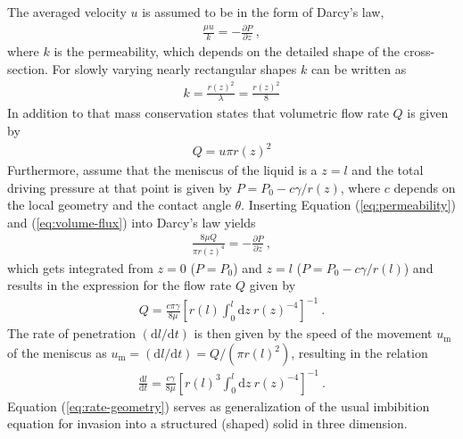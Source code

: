 \documentclass[aip, amsmath, amssymb, reprint, twocolumn, floatfix]{revtex4-1}
\newcommand{\dldt}{\frac{\mathrm{d}l}{\mathrm{d}t}}
\newcommand{\Pt}{P}
\newcommand{\dz}{\mathrm{d}z}
\begin{document}
\begin{center}
	\captionsetup{type=figure}
	
	\label{fig:geometry}
\end{center}

The averaged velocity $u$ is assumed to be in the form of Darcy's law,
\begin{gather}
	\frac{\mu u}{k} = -\frac{\partial \Pt}{\partial z}~,
	\label{eq:darcy-law}
\end{gather}
where $k$ is the permeability, which depends on the detailed shape of the cross-section. For slowly varying nearly rectangular shapes $k$ can be written as
\begin{gather}
	k = \frac{r(z)^2}{\lambda} = \frac{r(z)^2}{8}
	\label{eq:permeability}
\end{gather}
In addition to that mass conservation states that volumetric flow rate $Q$ is given by
\begin{gather}
	Q = u \pi r(z)^2  
	\label{eq:volume-flux}
\end{gather}
Furthermore, assume that the meniscus of the liquid is a $z = l$ and the total driving pressure at that point is given by $\Pt = P_0 - c \gamma/r(z)$, where $c$ depends on the local geometry and the contact angle $\theta$. Inserting Equation (\ref{eq:permeability}) and (\ref{eq:volume-flux}) into Darcy's law yields
\begin{gather}
	\frac{8 \mu Q}{\pi r(z)^4} = -\frac{\partial \Pt}{\partial z}~,
	\label{eq:darcy-law-flux}
\end{gather}
which gets integrated from $z=0$ ($\Pt = P_0$) and $z = l$ ($\Pt = P_0  - c \gamma/r(l)$) and results in the expression for the flow rate $Q$ given by
\begin{gather}
	Q = \frac{c \pi \gamma}{8\mu} \left[ r(l) \int_0^{l}\!\!\!\dz~r(z)^{-4} \right]^{-1}~.
	\label{eq:volume-flux-integral}
\end{gather}
The rate of penetration $\left(\mathrm{d}l/\mathrm{d}t\right)$ is then given by the speed of the movement $u_\mathrm{m}$ of the meniscus as $u_\mathrm{m} = \left(\mathrm{d}l/\mathrm{d}t\right) = Q / (\pi r(l)^2)$, resulting in the relation
\begin{gather}
	\boxed{\dldt = \frac{c \gamma}{8\mu} \left[ r(l)^3 \int_0^{l}\!\!\!\dz~r(z)^{-4} \right]^{-1}}~.
	\label{eq:rate-geometry}
\end{gather}
Equation (\ref{eq:rate-geometry}) serves as generalization of the usual imbibition equation for invasion into a structured (shaped) solid in three dimension.
\bigskip
\end{document}
